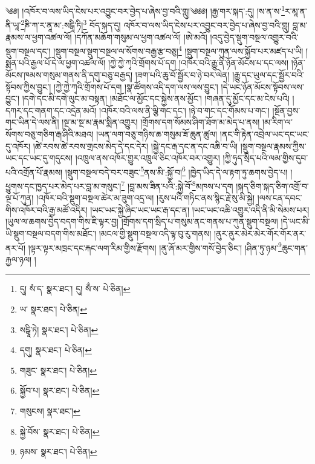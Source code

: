 \setcounter{footnote}{0} 
༄༅། །འཁོར་བ་ལས་ཡིད་ངེས་པར་འབྱུང་བར་བྱེད་པ་ཞེས་བྱ་བའི་གླུ།༄༅༅། །རྒྱ་གར་སྐད་:དུ། །ས་ན་ས་\footnote{དུ། སཾ་ད་  སྣར་ཐང་། དུ། སྃ་ས་  པེ་ཅིན། }ར་མཱ་ན་ནི་ཡཱ་\footnote{ཡ་  སྣར་ཐང་།  པེ་ཅིན། }ཎི་ཀ་ར་ནཱ་མ་:སངྒཱི་ཏི།\footnote{སངྒཱི་ཏེ།  སྣར་ཐང་།  པེ་ཅིན། } བོད་སྐད་དུ། འཁོར་བ་ལས་ཡིད་ངེས་པར་འབྱུང་བར་བྱེད་པ་ཞེས་བྱ་བའི་གླུ། བླ་མ་རྣམས་ལ་ཕྱག་འཚལ་ལོ། །དཀོན་མཆོག་གསུམ་ལ་ཕྱག་འཚལ་ལོ། །ཨེ་མའོ། །འདུ་བྱེད་སྡུག་བསྔལ་འགྱུར་བའི་སྡུག་བསྔལ་དང་། །སྡུག་བསྔལ་སྡུག་བསྔལ་ལ་སོགས་བརྒྱ་རྩ་བཅུ།\footnote{དགུ།  སྣར་ཐང་།  པེ་ཅིན། } །སྡུག་བསྔལ་ཀུན་ལས་སྐྱོབ་པར་མཛད་པ་ཡི། །སྨན་པའི་རྒྱལ་པོ་དེ་ལ་ཕྱག་འཚལ་ལོ། །ཀྱེ་ཀྱེ་ཀྭའི་གྲོགས་པོ་དག །འཁོར་བའི་རྒྱུ་ནི་ཉོན་མོངས་པ་དང་ལས། །ཉོན་མོངས་ཁམས་གསུམ་གནས་ནི་དགུ་བཅུ་བརྒྱད། །ཟག་པའི་ཆུ་བོ་སྦྱོར་བ་ཉེ་བར་ལེན། །རྒྱུ་དང་ཡུལ་དང་སྦྱོར་བའི་སྟོབས་ཀྱིས་བྱུང་། །ཀྱེ་ཀྱེ་ཀྭའི་གྲོགས་པོ་དག །སྣ་ཚོགས་འདི་དག་ལས་ལས་བྱུང་། །དེ་ཡང་ཉོན་མོངས་སྟོབས་ལས་བྱུང་། །དགེ་དང་མི་དགེ་ལུང་མ་བསྟན། །མཐོང་ལ་མྱོང་དང་སྐྱེས་ནས་མྱོང་། །གཞན་དུ་མྱོང་དང་མ་ངེས་པའི། །དཀར་དང་གནག་དང་འདྲེན་མའོ། །འཁོར་བའི་ལས་ནི་ལྕི་གང་དང་། །ཉེ་བ་གང་དང་གོམས་པ་གང་། །སྔོན་བྱས་གང་ཡིན་དེ་ལས་ནི། །སྔ་མ་སྔ་མ་རྣམ་སྨིན་འགྱུར། །གྲོགས་དག་སོམས་ཤིག་ཐོག་མ་མེད་པ་ནས། །མ་རིག་ལ་སོགས་བཅུ་གཅིག་རྒ་ཤིའི་མཐའ། །ཡན་ལག་བཅུ་གཉིས་ཆ་གསུམ་ཟོ་ཆུན་ཚུལ། །ནང་གི་རྟེན་འབྲེལ་ཡང་དང་ཡང་དུ་འཁོར། །ཚེ་རབས་ཚེ་རབས་གྲངས་མེད་དེ་དང་དེར། །སྐྱེ་དང་རྒ་དང་ན་དང་འཆི་བ་ཡི། །སྡུག་བསྔལ་རྣམས་ཀྱིས་ཡང་དང་ཡང་དུ་གདུངས། །འཁྲུལ་ནས་འཁོར་གྱུར་འཁྲུལ་ཅིང་འཁོར་བར་འགྱུར། །ཀྱི་ཧུད་སྲིད་པའི་ལམ་གྱིས་དུབ་པའི་འགྲོན་པོ་རྣམས། །སྡུག་བསྔལ་བདེ་བར་བཟུང་\footnote{གཟུང་  སྣར་ཐང་།  པེ་ཅིན། }ནས་མི་:སྐྱོ་བ།\footnote{སྐྱོབ་པ།  སྣར་ཐང་།  པེ་ཅིན། } །ཁྱེད་ཡིད་དེ་ལ་རྟག་ཏུ་ཆགས་བྱེད་པ། །ཕྱུགས་དང་ཁྱད་པར་མེད་པར་བླ་མ་གསུང་།\footnote{གསུངས།  སྣར་ཐང་། } །བླ་མས་ཟིན་པའི་:སྐྱེ་བོ་\footnote{སྐྱེ་བོས་  སྣར་ཐང་།  པེ་ཅིན། }མཁས་པ་དག །སྐད་ཅིག་སྐད་ཅིག་འགྲོ་བ་ལྔ་པོ་ཀུན། །འཁོར་བའི་སྡུག་བསྔལ་ཚེར་མ་ཟུག་འདྲ་ལ། །རུས་པའི་གཏིང་ནས་སྙིང་རྗེ་སུ་མི་སྐྱེ། །ལས་ངན་དབང་གིས་འཁོར་བའི་རྒྱ་མཚོ་འདིར། །ཡང་ཡང་སྐྱེ་ཞིང་ཡང་ཡང་རྒ་དང་ན། །ཡང་ཡང་འཆི་འགྱུར་འདི་ནི་མི་སེམས་པར། །ཡུལ་ལ་ཆགས་བྱེད་བདག་གིས་ཇི་ལྟར་བྱ། །གྲོགས་དག་སྲིད་པ་གསུམ་ནང་གནས་པ་ཀུན་སྡུག་བསྔལ། །དེ་ཡང་མི་ཡི་སྡུག་བསྔལ་བདག་གིས་མཐོང་། །མངལ་གྱི་སྡུག་བསྔལ་འདི་ལྟ་བུ་རུ་གནས། །ནུར་ནུར་མེར་མེར་གོར་གོར་ནར་ནར་པོ། །ལྟར་ལྟར་མཁྲང་དང་རྐང་ལག་རིམ་གྱིས་རྫོགས། །ནུ་ཞོ་མར་གྱིས་གསོ་བྱེད་ཅིང་། །ཤིན་ཏུ་ཉམ་\footnote{ཉམས་  སྣར་ཐང་།  པེ་ཅིན། }ཆུང་གན་རྐྱལ་ཉལ། །
